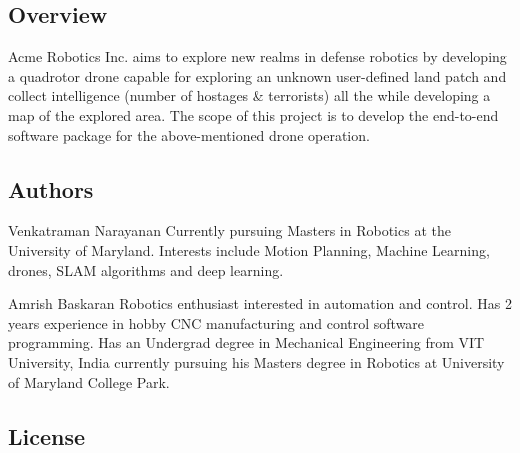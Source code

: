 \href{https://opensource.org/licenses/MIT}{\tt } \href{https://travis-ci.org/vijay4313/intelli_bot}{\tt } \href{https://coveralls.io/github/vijay4313/intelli_bot?branch=master}{\tt }

\subsection*{Overview}

Acme Robotics Inc. aims to explore new realms in defense robotics by developing a quadrotor drone capable for exploring an unknown user-\/defined land patch and collect intelligence (number of hostages \& terrorists) all the while developing a map of the explored area. The scope of this project is to develop the end-\/to-\/end software package for the above-\/mentioned drone operation.

\subsection*{Authors}


\begin{DoxyItemize}
\item Venkatraman Narayanan Currently pursuing Masters in Robotics at the University of Maryland. Interests include Motion Planning, Machine Learning, drones, S\+L\+AM algorithms and deep learning.
\item Amrish Baskaran Robotics enthusiast interested in automation and control. Has 2 years experience in hobby C\+NC manufacturing and control software programming. Has an Undergrad degree in Mechanical Engineering from V\+IT University, India currently pursuing his Master\textquotesingle{}s degree in Robotics at University of Maryland College Park.
\end{DoxyItemize}

\subsection*{License}

